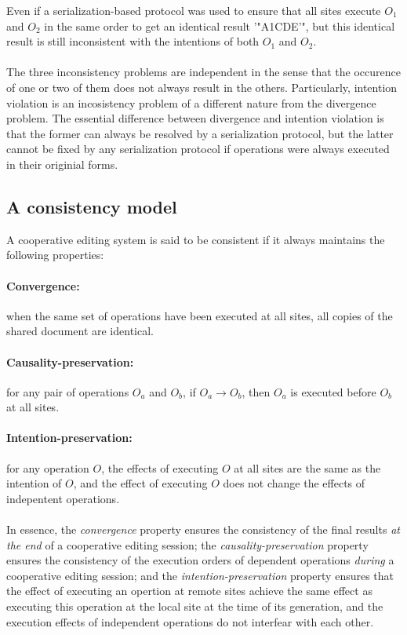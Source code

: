 \documentclass[11pt,a4paper]{article}
\begin{document}
Even if a serialization-based protocol was used to ensure that all sites execute $O_{1}$ and $O_{2}$ in the same order to get an identical result '"A1CDE'", but this identical result is still inconsistent with the intentions of both $O_{1}$ and $O_{2}$.

\paragraph{} 
The three inconsistency problems are independent in the sense that the occurence of one or two of them does not always result in the others. Particularly, intention violation is an incosistency problem of a different nature from the divergence problem. The essential difference between divergence and intention violation is that the former can always be resolved by a serialization protocol, but the latter cannot be fixed by any serialization protocol if operations were always executed in their originial forms.


\subsection{A consistency model}
A cooperative editing system is said to be consistent if it always maintains the following properties:
\paragraph{Convergence:} when the same set of operations have been executed at all sites, all copies of the shared document are identical.
\paragraph{Causality-preservation:} for any pair of operations $O_a$ and $O_b$, if $O_a \rightarrow O_b$, then $O_a$ is executed before $O_b$ at all sites.
\paragraph{Intention-preservation:} for any operation $O$, the effects of executing $O$ at all sites are the same as the intention of $O$, and the effect of executing $O$ does not change the effects of indepentent operations.

\paragraph{}
In essence, the \emph{convergence} property ensures the consistency of the final results \emph{at the end} of a cooperative editing session; the \emph{causality-preservation} property ensures the consistency of the execution orders of dependent operations \emph{during} a cooperative editing session; and the \emph{intention-preservation} property ensures that the effect of executing an opertion at remote sites achieve the same effect as executing this operation at the local site at the time of its generation, and the execution effects of independent operations do not interfear with each other. 
\end{document}
